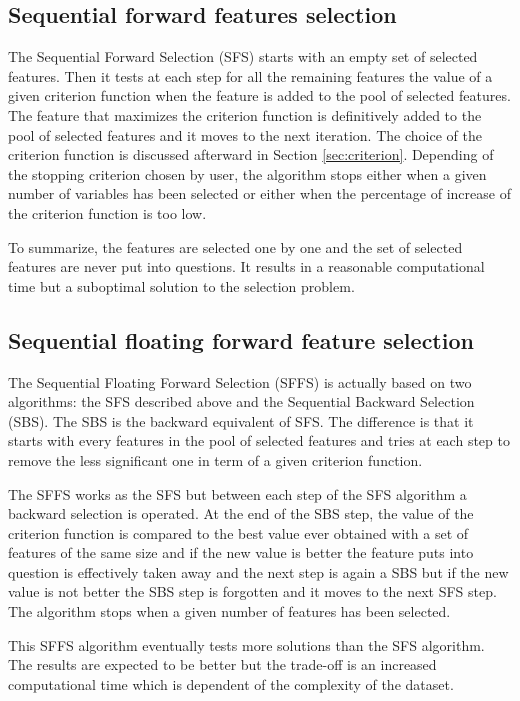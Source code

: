 \documentclass[a4paper]{article}
\begin{document}
    \subsection{Sequential forward features selection}
    \label{sec:forward-presentation}

    The Sequential Forward Selection (SFS) starts with an empty set of selected features. Then it tests at each step for all the remaining features the value of a given criterion function when the feature is added to the pool of selected features. The feature that maximizes the criterion function is definitively added to the pool of selected features and it moves to the next iteration. The choice of the criterion function is discussed afterward in Section \ref{sec:criterion}. Depending of the stopping criterion chosen by user, the algorithm stops either when a given number of variables has been selected or either when the percentage of increase of the criterion function is too low.

    To summarize, the features are selected one by one and the set of selected features are never put into questions. It results in a reasonable computational time but a suboptimal solution to the selection problem.

    \subsection{Sequential floating forward feature selection}
    \label{sec:floating-presentation}

    The Sequential Floating Forward Selection (SFFS) is actually based on two algorithms: the SFS described above and the Sequential Backward Selection (SBS). The SBS is the backward equivalent of SFS. The difference is that it starts with every features in the pool of selected features and tries at each step to remove the less significant one in term of a given criterion function.

    The SFFS works as the SFS but between each step of the SFS algorithm a backward selection is operated. At the end of the SBS step, the value of the criterion function is compared to the best value ever obtained with a set of features of the same size and if the new value is better the feature puts into question is effectively taken away and the next step is again a SBS but if the new value is not better the SBS step is forgotten and it moves to the next SFS step. The algorithm stops when a given number of features has been selected.

    This SFFS algorithm eventually tests more solutions than the SFS algorithm. The results are expected to be better but the trade-off is an increased computational time which is dependent of the complexity of the dataset.
\end{document}
